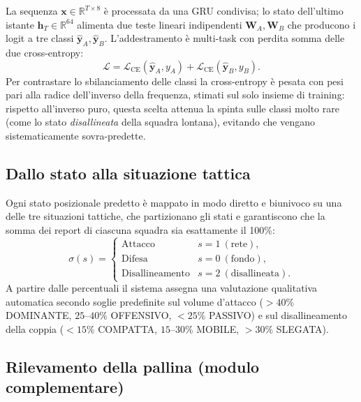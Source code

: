 \documentclass[10pt,twocolumn,a4paper]{article}
\begin{document}
	La sequenza $\mathbf{x}\in\mathbb{R}^{T\times8}$ è processata da una GRU
	condivisa; lo stato dell'ultimo istante
	$\mathbf{h}_T\in\mathbb{R}^{64}$ alimenta due teste lineari indipendenti
	$\mathbf{W}_A,\mathbf{W}_B$ che producono i logit a tre classi
	$\hat{\mathbf{y}}_A,\hat{\mathbf{y}}_B$. L'addestramento è multi-task con
	perdita somma delle due cross-entropy:
	\begin{equation}
		\mathcal{L} = \mathcal{L}_{\text{CE}}(\hat{\mathbf{y}}_A,y_A)
		+ \mathcal{L}_{\text{CE}}(\hat{\mathbf{y}}_B,y_B).
	\end{equation}
	Per contrastare lo sbilanciamento delle classi la cross-entropy è pesata con
	pesi pari alla radice dell'inverso della frequenza, stimati sul solo insieme
	di training: rispetto all'inverso puro, questa scelta attenua la spinta sulle
	classi molto rare (come lo stato \emph{disallineata} della squadra lontana),
	evitando che vengano sistematicamente sovra-predette.

	\subsection{Dallo stato alla situazione tattica}
	\label{sec:logic}

	Ogni stato posizionale predetto è mappato in modo diretto e biunivoco su una
	delle tre situazioni tattiche, che partizionano gli stati e garantiscono che
	la somma dei report di ciascuna squadra sia esattamente il 100\%:
	\begin{equation}
		\sigma(s)=\begin{cases}
			\text{Attacco} & s=1\ (\text{rete}),\\
			\text{Difesa} & s=0\ (\text{fondo}),\\
			\text{Disallineamento} & s=2\ (\text{disallineata}).
		\end{cases}
	\end{equation}
	A partire dalle percentuali il sistema assegna una valutazione qualitativa
	automatica secondo soglie predefinite sul volume d'attacco (${>}40\%$
	DOMINANTE, $25$--$40\%$ OFFENSIVO, ${<}25\%$ PASSIVO) e sul disallineamento
	della coppia (${<}15\%$ COMPATTA, $15$--$30\%$ MOBILE, ${>}30\%$ SLEGATA).

	\subsection{Rilevamento della pallina (modulo complementare)}
\end{document}
